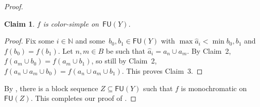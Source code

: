\documentclass{article}
\newcommand{\NN}[0]{\mathbb{N}}
\newcommand{\FU}[0]{\mathsf{FU}} %
\numberwithin{theorem}{section}
\newtheorem{claim}{Claim}
\begin{document}
\begin{proof}
\begin{claim}
$f$ is color-simple on~$\FU(Y)$.
\end{claim}
\begin{proof}
Fix some $i \in \NN$ and some~$b_0, b_1 \in \FU(Y)$ with $\max \hat a_i < \min b_0, b_1$ and $f(b_0) = f(b_1)$.
Let $n, m \in B$ be such that $\hat a_i = a_n \cup a_m$. By Claim~2, $f(a_m \cup b_0) = f(a_m \cup b_1)$, so still by Claim~2, $f(a_n \cup a_m \cup b_0) = f(a_n \cup a_m \cup b_1)$. This proves Claim~3.
\end{proof}

By , there is a block sequence $Z \subseteq \FU(Y)$ such that $f$ is monochromatic on~$\FU(Z)$. This completes our proof of .
\end{proof}



\end{document}
